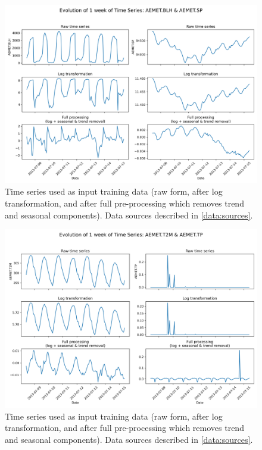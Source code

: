 \documentclass[12pt,a4paper]{book}
\begin{document}
\newpage
{} 


\begin{figure}[h]
  \centering  
  \includegraphics[width=\textwidth]{time_series_page_1.png}
  \caption{Time series used as input training data (raw form, after log transformation, and after full pre-processing which removes trend and seasonal components). Data sources described in \ref{data:sources}.}
  \label{fig:evo_ts1}
\end{figure}

\begin{figure}[h]
  \centering  
  \includegraphics[width=\textwidth]{time_series_page_2.png}
  \caption{Time series used as input training data (raw form, after log transformation, and after full pre-processing which removes trend and seasonal components). Data sources described in \ref{data:sources}.}
  \label{fig:evo_ts2}
\end{figure}
\end{document}
